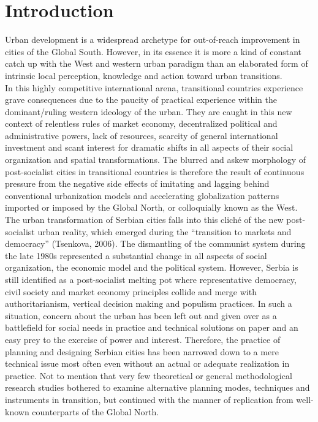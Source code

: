 \documentclass[11pt]{report}
\begin{document}

\chapter{Introduction}

Urban development is a widespread archetype for out-of-reach improvement in cities of the Global South. However, in its essence it is more a kind of constant catch up with the West and western urban paradigm than an elaborated form of intrinsic local perception, knowledge and action toward urban transitions.
\\
In this highly competitive international arena, transitional countries experience grave consequences due to the paucity of practical experience within the dominant/ruling western ideology of the urban. They are caught in this new context of relentless rules of market economy, decentralized political and administrative powers, lack of resources, scarcity of general international investment and scant interest for dramatic shifts in all aspects of their social organization and spatial transformations. The blurred and askew morphology of post-socialist cities in transitional countries is therefore the result of continuous pressure from the negative side effects of imitating and lagging behind conventional urbanization models and accelerating globalization patterns imported or imposed by the Global North, or colloquially known  as the West.
\\
The urban transformation of Serbian cities falls into this cliché of the new post-socialist urban reality, which emerged during the “transition to markets and democracy” (Tsenkova, 2006). The dismantling of the communist system during the late 1980s represented a substantial change in all aspects of social organization, the economic model and the political system. However, Serbia is still identified as a post-socialist melting pot where representative democracy, civil society and market economy principles collide and merge with authoritarianism, vertical decision making and populism practices. In such a situation, concern about the urban has been left out and given over as a battlefield for social needs in practice and technical solutions on paper and an easy prey to the exercise of power and interest. Therefore, the practice of planning and designing Serbian cities has been narrowed down to a mere technical issue most often even without an actual or adequate realization in practice. Not to mention that very few theoretical or general methodological research studies bothered to examine alternative planning modes, techniques and instruments in transition, but continued with the manner of replication from well-known counterparts of the Global North.
\end{document}
